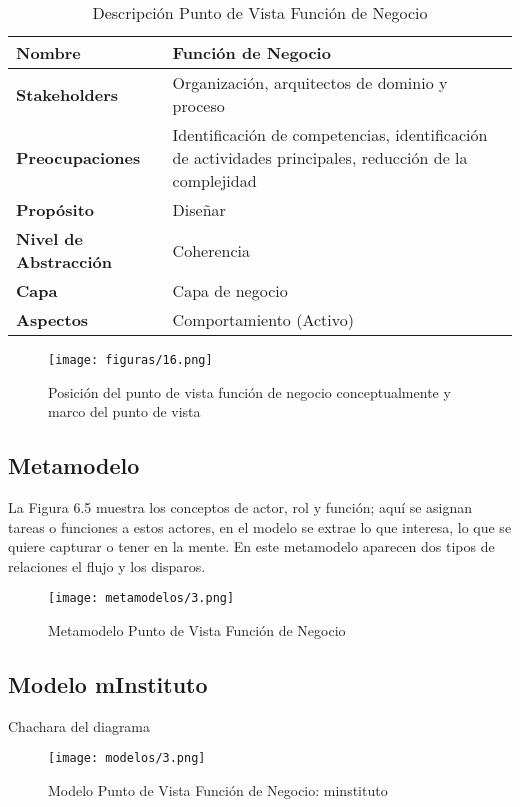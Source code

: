   \begin{table}[!h]
  	\centering
  	\begin{tabular}{lp{8cm}}
  		\toprule
  		\textbf{Nombre} & \textbf{Función de Negocio} \\
  		\midrule
  		\textbf{Stakeholders} & Organización, arquitectos de dominio y proceso \\
  		\textbf{Preocupaciones} & Identificación de competencias, identificación de actividades principales, reducción de la complejidad \\
  		\textbf{Propósito} & Diseñar \\
  		\textbf{Nivel de Abstracción} & Coherencia \\
  		\textbf{Capa} & Capa de negocio \\
  		\textbf{Aspectos} & Comportamiento (Activo) \\
  		\bottomrule
  	\end{tabular}
   	\captionsetup{width=.95\textwidth}
   	\caption{Descripción Punto de Vista Función de Negocio}
   	\label{Tab:tabla6}
  \end{table}

  \begin{figure}[!h]
   	\centering
   	\texttt{[image: figuras/16.png]}
   	\captionsetup{width=.95\textwidth}
   	\caption{Posición del punto de vista función de negocio conceptualmente y marco del punto de vista}
   	\label{figura16}
   \end{figure}
    
   \subsection{Metamodelo}
   La Figura 6.5 muestra los conceptos de actor, rol y función; aquí se asignan tareas o funciones a estos actores, en el modelo se extrae lo que interesa, lo que se quiere capturar o tener en la mente. En este metamodelo aparecen dos tipos de relaciones el flujo y los disparos.
    
   \begin{figure}[!h]
   	\centering
   	\texttt{[image: metamodelos/3.png]}
   	\captionsetup{width=.95\textwidth}
   	\caption{Metamodelo Punto de Vista Función de Negocio}
   	\label{metamodelo3}
   \end{figure}
    
    \subsection{Modelo mInstituto}Chachara del diagrama
    \begin{figure}[!h]
    	\centering
    	\texttt{[image: modelos/3.png]}
    	\captionsetup{width=.95\textwidth}
    	\caption{Modelo Punto de Vista Función de Negocio: minstituto}
    	\label{modelo3}
    \end{figure}

